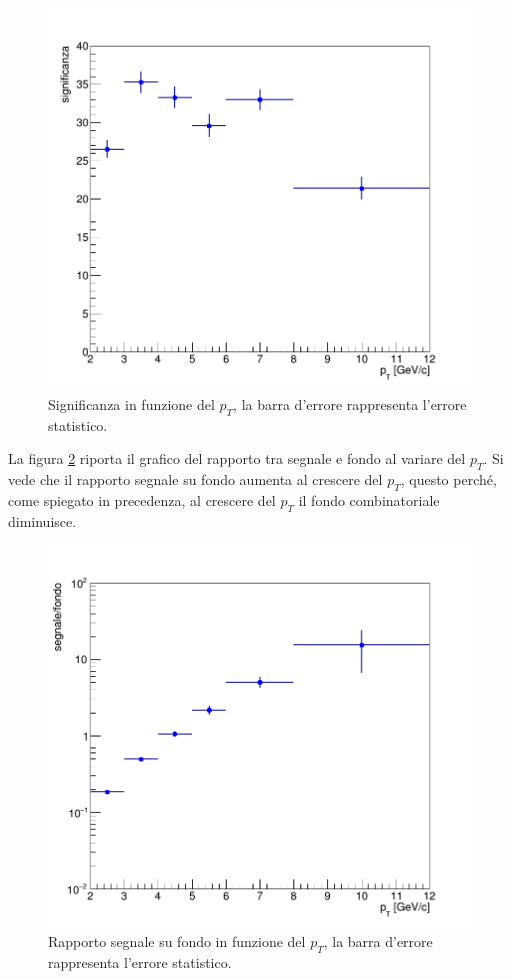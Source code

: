     \begin{figure}[h] 
        \centering
        \includegraphics[width=0.8\linewidth]{AnalisiDati/significance_BDT.png}
        \caption{Significanza in funzione del $p_T$, la barra d'errore rappresenta l'errore statistico.}
        \label{fig:significatività}
    \end{figure}


La figura \ref{fig:s_b} riporta il grafico del rapporto tra segnale e fondo al variare del $p_T$. Si vede che il rapporto segnale su fondo aumenta al crescere del $p_T$, questo perché, come spiegato in precedenza, al crescere del $p_T$ il fondo combinatoriale diminuisce.

    \begin{figure}[htbp] 
        \centering
        \includegraphics[width=0.8\linewidth]{AnalisiDati/s_b.png}
        \caption{Rapporto segnale su fondo in funzione del $p_T$, la barra d'errore rappresenta l'errore statistico.}
        \label{fig:s_b}
    \end{figure}
    
